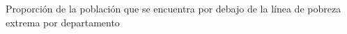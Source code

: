Proporción de la población que se encuentra por debajo de la línea de pobreza extrema por departamento